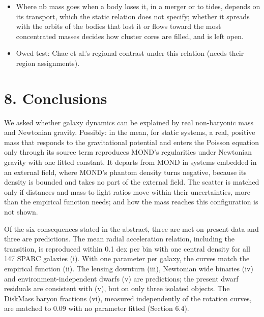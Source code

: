 \documentclass[
  10pt,
]{article}
\begin{document}
\begin{itemize}
\item Where nb mass goes when a body loses it, in a merger or to tides, depends on its transport, which the static relation does not specify; whether it spreads with the orbits of the bodies that lost it or flows toward the most concentrated masses decides how cluster cores are filled, and is left open.
\item Owed test: Chae et al.'s regional contrast under this relation (needs their region assignments).
\end{itemize}


\section{8. Conclusions}\label{conclusions}

We asked whether galaxy dynamics can be explained by real non-baryonic mass and Newtonian gravity. Possibly: in the mean, for static systems, a real, positive mass that responds to the gravitational potential and enters the Poisson equation only through its source term reproduces MOND's regularities under Newtonian gravity with one fitted constant. It departs from MOND in systems embedded in an external field, where MOND's phantom density turns negative, because its density is bounded and takes no part of the external field. The scatter is matched only if distances and mass-to-light ratios move within their uncertainties, more than the empirical function needs; and how the mass reaches this configuration is not shown.

Of the six consequences stated in the abstract, three are met on present data and three are predictions. The mean radial acceleration relation, including the transition, is reproduced within 0.1 dex per bin with one central density for all 147 SPARC galaxies (i). With one parameter per galaxy, the curves match the empirical function (ii). The lensing downturn (iii), Newtonian wide binaries (iv) and environment-independent dwarfs (v) are predictions; the present dwarf residuals are consistent with (v), but on only three isolated objects. The DiskMass baryon fractions (vi), measured independently of the rotation curves, are matched to 0.09 with no parameter fitted (Section 6.4).
\end{document}
